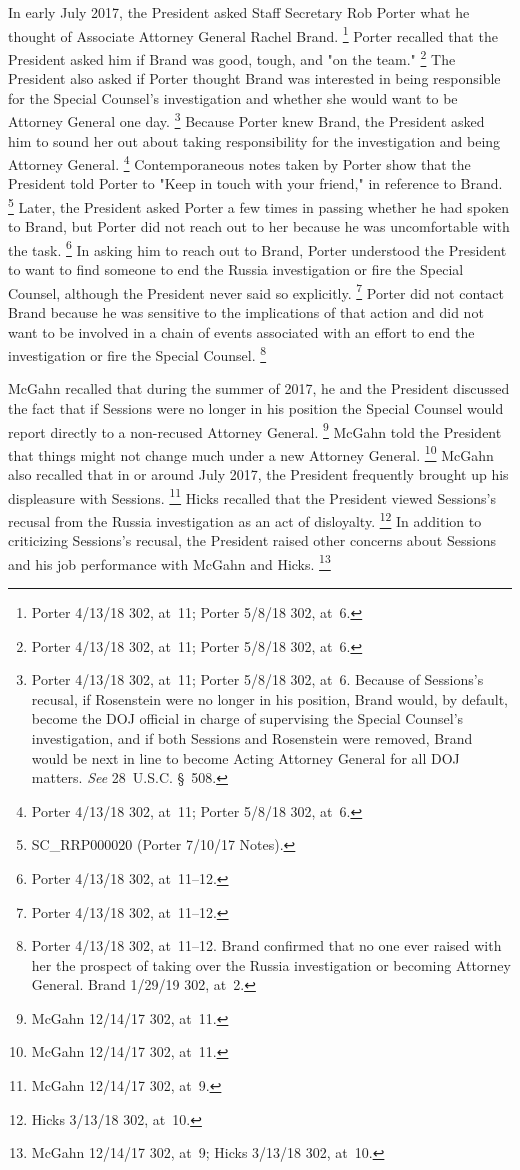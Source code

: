 In early July 2017, the President asked Staff Secretary Rob Porter what he thought of Associate Attorney General Rachel Brand.%
\footnote{Porter 4/13/18 302, at~11;
Porter 5/8/18 302, at~6.}
Porter recalled that the President asked him if Brand was good, tough, and "on the team."%
\footnote{Porter 4/13/18 302, at~11;
Porter 5/8/18 302, at~6.}
The President also asked if Porter thought Brand was interested in being responsible for the Special Counsel's investigation and whether she would want to be Attorney General one day.%
\footnote{Porter 4/13/18 302, at~11;
Porter 5/8/18 302, at~6.
Because of Sessions's recusal, if Rosenstein were no longer in his position, Brand would, by default, become the DOJ official in charge of supervising the Special Counsel's investigation, and if both Sessions and Rosenstein were removed, Brand would be next in line to become Acting Attorney General for all DOJ matters.
\textit{See} 28~U.S.C. \S~508.}
Because Porter knew Brand, the President asked him to sound her out about taking responsibility for the investigation and being Attorney General.%
\footnote{Porter 4/13/18 302, at~11;
Porter 5/8/18 302, at~6.}
Contemporaneous notes taken by Porter show that the President told Porter to "Keep in touch with your friend," in reference to Brand.%
\footnote{SC\_RRP000020 (Porter 7/10/17 Notes).}
Later, the President asked Porter a few times in passing whether he had spoken to Brand, but Porter did not reach out to her because he was uncomfortable with the task.%
\footnote{Porter 4/13/18 302, at~11--12.}
In asking him to reach out to Brand, Porter understood the President to want to find someone to end the Russia investigation or fire the Special Counsel, although the President never said so explicitly.%
\footnote{Porter 4/13/18 302, at~11--12.}
Porter did not contact Brand because he was sensitive to the implications of that action and did not want to be involved in a chain of events associated with an effort to end the investigation or fire the Special Counsel.%
\footnote{Porter 4/13/18 302, at~11--12.
Brand confirmed that no one ever raised with her the prospect of taking over the Russia investigation or becoming Attorney General.
Brand 1/29/19 302, at~2.}

McGahn recalled that during the summer of 2017, he and the President discussed the fact that if Sessions were no longer in his position the Special Counsel would report directly to a non-recused Attorney General.%
\footnote{McGahn 12/14/17 302, at~11.}
McGahn told the President that things might not change much under a new Attorney General.%
\footnote{McGahn 12/14/17 302, at~11.}
McGahn also recalled that in or around July 2017, the President frequently brought up his displeasure with Sessions.%
\footnote{McGahn 12/14/17 302, at~9.}
Hicks recalled that the President viewed Sessions's recusal from the Russia investigation as an act of disloyalty.%
\footnote{Hicks 3/13/18 302, at~10.}
In addition to criticizing Sessions's recusal, the President raised other concerns about Sessions and his job performance with McGahn and Hicks.%
\footnote{McGahn 12/14/17 302, at~9;
Hicks 3/13/18 302, at~10.}

